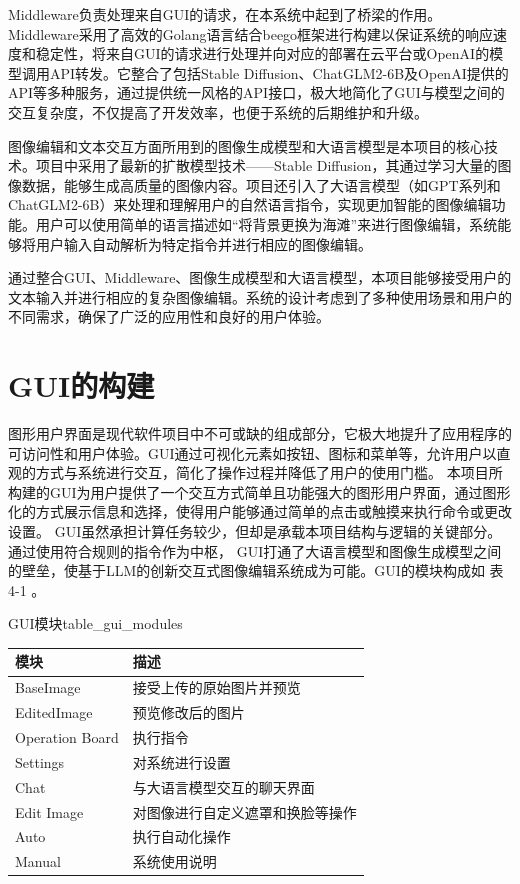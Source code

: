 \documentclass[a4paper,AutoFakeBold,oneside,12pt]{book}
\begin{document}
Middleware负责处理来自GUI的请求，在本系统中起到了桥梁的作用。Middleware采用了高效的Golang语言结合beego框架进行构建以保证系统的响应速度和稳定性，将来自GUI的请求进行处理并向对应的部署在云平台或OpenAI的模型调用API转发。它整合了包括Stable Diffusion、ChatGLM2-6B及OpenAI提供的API等多种服务，通过提供统一风格的API接口，极大地简化了GUI与模型之间的交互复杂度，不仅提高了开发效率，也便于系统的后期维护和升级。

图像编辑和文本交互方面所用到的图像生成模型和大语言模型是本项目的核心技术。项目中采用了最新的扩散模型技术——Stable Diffusion，其通过学习大量的图像数据，能够生成高质量的图像内容。项目还引入了大语言模型（如GPT系列和ChatGLM2-6B）来处理和理解用户的自然语言指令，实现更加智能的图像编辑功能。用户可以使用简单的语言描述如“将背景更换为海滩”来进行图像编辑，系统能够将用户输入自动解析为特定指令并进行相应的图像编辑。

通过整合GUI、Middleware、图像生成模型和大语言模型，本项目能够接受用户的文本输入并进行相应的复杂图像编辑。系统的设计考虑到了多种使用场景和用户的不同需求，确保了广泛的应用性和良好的用户体验。


\section{GUI的构建} %
图形用户界面是现代软件项目中不可或缺的组成部分，它极大地提升了应用程序的可访问性和用户体验。GUI通过可视化元素如按钮、图标和菜单等，允许用户以直观的方式与系统进行交互，简化了操作过程并降低了用户的使用门槛。
本项目所构建的GUI为用户提供了一个交互方式简单且功能强大的图形用户界面，通过图形化的方式展示信息和选择，使得用户能够通过简单的点击或触摸来执行命令或更改设置。
GUI虽然承担计算任务较少，但却是承载本项目结构与逻辑的关键部分。通过使用符合规则的指令作为中枢，
GUI打通了大语言模型和图像生成模型之间的壁垒，使基于LLM的创新交互式图像编辑系统成为可能。GUI的模块构成如 表4-1 。
\begin{bupttable}{GUI模块}{table_gui_modules}
    \begin{tabular}{|l|l|}
        \hline \textbf{模块} & \textbf{描述} \\
        \hline BaseImage & 接受上传的原始图片并预览  \\
        \hline EditedImage & 预览修改后的图片 \\
        \hline Operation Board & 执行指令  \\
		\hline Settings & 对系统进行设置  \\
		\hline Chat & 与大语言模型交互的聊天界面  \\
		\hline Edit Image & 对图像进行自定义遮罩和换脸等操作  \\
		\hline Auto & 执行自动化操作  \\
		\hline Manual & 系统使用说明  \\
        \hline
    \end{tabular}
\end{bupttable}
\end{document}
